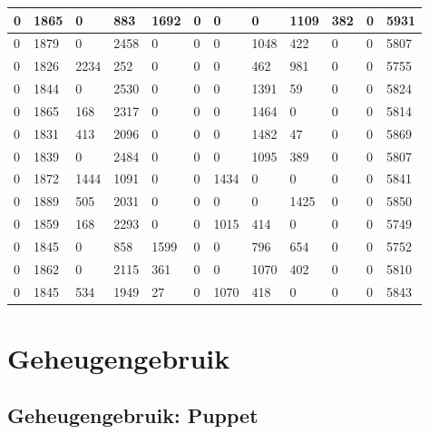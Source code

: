 \begin{longtable}{ | l | l | l | l | l | l | l | l | l | l | l || l | }
	0 & 1865 & 0 & 883 & 1692 & 0 & 0 & 0 & 1109 & 382 & 0 & 5931   \\ \hline
	0 & 1879 & 0 & 2458 & 0 & 0 & 0 & 1048 & 422 & 0 & 0 & 5807 \\ \hline
	0 & 1826 & 2234 & 252 & 0 & 0 & 0 & 462 & 981 & 0 & 0 & 5755   \\ \hline
	0 & 1844 & 0 & 2530 & 0 & 0 & 0 & 1391 & 59 & 0 & 0 & 5824    \\ \hline
	0 & 1865 & 168 & 2317 & 0 & 0 & 0 & 1464 & 0 & 0 & 0 & 5814  \\ \hline
	0 & 1831 & 413 & 2096 & 0 & 0 & 0 & 1482 & 47 & 0 & 0 & 5869    \\ \hline
	0 & 1839 & 0 & 2484 & 0 & 0 & 0 & 1095 & 389 & 0 & 0 & 5807   \\ \hline
	0 & 1872 & 1444 & 1091 & 0 & 0 & 1434 & 0 & 0 & 0 & 0 & 5841 \\\hline
	0 & 1889 & 505 & 2031 & 0 & 0 & 0 & 0 & 1425 & 0 & 0 & 5850    \\ \hline
	0 & 1859 & 168 & 2293 & 0 & 0 & 1015 & 414 & 0 & 0 & 0 & 5749  \\ \hline
	0 & 1845 & 0 & 858 & 1599 & 0 & 0 & 796 & 654 & 0 & 0 & 5752   \\ \hline
	0 & 1862 & 0 & 2115 & 361 & 0 & 0 & 1070 & 402 & 0 & 0 & 5810   \\ \hline
	0 & 1845 & 534 & 1949 & 27 & 0 & 1070 & 418 & 0 & 0 & 0 & 5843   \\ \hline



\end{longtable}


\section*{Geheugengebruik}
\label{dataset:geheugengebruik}

\subsection*{Geheugengebruik: Puppet}
\label{dataset:deploytijden:puppet}

